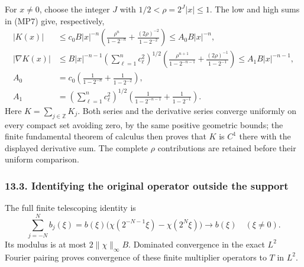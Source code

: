 \documentclass[
  11pt,
]{article}
\makeatletter
\let\ReaderOriginalAnchorStart\hyper@anchorstart
\let\ReaderOriginalAnchorEnd\hyper@anchorend
\let\ReaderPendingAliases\@empty
\def\ReaderArmAliases#1{\gdef\ReaderPendingAliases{#1}}
\def\hyper@anchorstart#1{\ReaderIfNativeAnchorTF{#1}{\ReaderPendingAliases\global\let\ReaderPendingAliases\@empty}{}\ReaderOriginalAnchorStart{#1}}
\makeatother
\begin{document}
For \(x\ne0\), choose the integer \(J\) with \(1/2<\rho=2^J|x|\leq1\).
The low and high sums in (MP7) give, respectively, \[
 \begin{split}
 |K(x)|&\leq c_0B|x|^{-n}
 \left(\frac{\rho^n}{1-2^{-n}}
            +\frac{(2\rho)^{-2}}{1-2^{-2}}\right)
       \leq A_0B|x|^{-n},\\
 |\nabla K(x)|&\leq
 B|x|^{-n-1}\left(\sum_{\ell=1}^nc_\ell^2\right)^{1/2}
 \left(\frac{\rho^{n+1}}{1-2^{-n-1}}
            +\frac{(2\rho)^{-1}}{1-2^{-1}}\right)
       \leq A_1B|x|^{-n-1},\\
 A_0&=c_0\left(\frac1{1-2^{-n}}+\frac1{1-2^{-2}}\right),\\
 A_1&=\left(\sum_{\ell=1}^nc_\ell^2\right)^{1/2}
       \left(\frac1{1-2^{-n-1}}+\frac1{1-2^{-1}}\right).
 \end{split}                                                   \tag{MP9}
\] Here \(K=\sum_{j\in\mathbb Z}K_j\). Both series and the derivative
series converge uniformly on every compact set avoiding zero, by the
same positive geometric bounds; the finite fundamental theorem of
calculus then proves that \(K\) is \(C^1\) there with the displayed
derivative sum. The complete \(\rho\) contributions are retained before
their uniform comparison.

\ReaderArmAliases{\ReaderOriginalAnchorStart{AN03-LCE-MULT-003}\ReaderOriginalAnchorEnd\begingroup\expandafter\def\csname @currentHref\endcsname{AN03-LCE-MULT-003}\label{AN03-LCE-MULT-003}\endgroup\ReaderOriginalAnchorStart{identifying-the-original-operator-outside-the-support}\ReaderOriginalAnchorEnd}
\subsubsection{13.3. Identifying the original operator outside the
support}\label{identifying-the-original-operator-outside-the-support}

The full finite telescoping identity is \[
 \sum_{j=-N}^Nb_j(\xi)
 =b(\xi)\bigl(\chi(2^{-N-1}\xi)-\chi(2^N\xi)\bigr)
 \longrightarrow b(\xi)\quad(\xi\ne0).
                                                               \tag{MP10}
\] Its modulus is at most \(2\|\chi\|_\infty B\). Dominated convergence
in the exact \(L^2\) Fourier pairing proves convergence of these finite
multiplier operators to \(T\) in \(L^2\).
\end{document}
